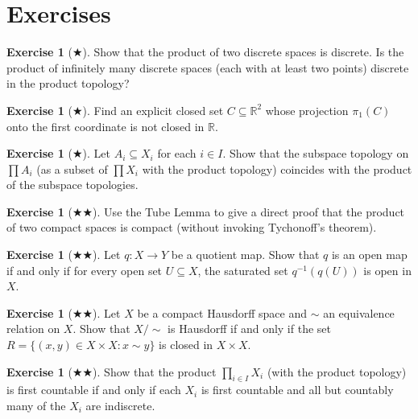 \documentclass[11pt,a4paper,twoside]{book}
\theoremstyle{remark}
\theoremstyle{definition}
\newtheorem{exerciseplain}[theorem]{Exercise}
\theoremstyle{definition}
\newenvironment{exercise}[1][]{%
  \begin{exerciseplain}[#1]
}{%
  \end{exerciseplain}
}
\begin{document}
\section{Exercises}\label{sec:product-quotient-exercises}

\begin{exercise}[$\bigstar$]\label{exo:product-discrete}
Show that the product of two discrete spaces is discrete.
Is the product of infinitely many discrete spaces (each with at
least two points) discrete in the product topology?
\end{exercise}

\begin{exercise}[$\bigstar$]\label{exo:projection-not-closed}
Find an explicit closed set $C\subseteq\mathbb{R}^2$ whose
projection $\pi_1(C)$ onto the first coordinate is not closed
in $\mathbb{R}$.
\end{exercise}

\begin{exercise}[$\bigstar$]\label{exo:product-subspace}
Let $A_i\subseteq X_i$ for each $i\in I$.  Show that the subspace
topology on $\prod A_i$ (as a subset of $\prod X_i$ with the product
topology) coincides with the product of the subspace topologies.
\end{exercise}

\begin{exercise}[$\bigstar\bigstar$]\label{exo:tube-lemma-application}
Use the Tube Lemma to give a direct proof that the product of two
compact spaces is compact (without invoking Tychonoff's theorem).
\end{exercise}

\begin{exercise}[$\bigstar\bigstar$]\label{exo:quotient-open-map}
Let $q\colon X\to Y$ be a quotient map.  Show that $q$ is an open
map if and only if for every open set $U\subseteq X$, the saturated
set $q^{-1}(q(U))$ is open in $X$.
\end{exercise}

\begin{exercise}[$\bigstar\bigstar$]\label{exo:quotient-hausdorff}
Let $X$ be a compact Hausdorff space and $\sim$ an equivalence
relation on $X$.  Show that $X/{\sim}$ is Hausdorff if and only if
the set $R=\{(x,y)\in X\times X:x\sim y\}$ is closed in
$X\times X$.
\end{exercise}

\begin{exercise}[$\bigstar\bigstar$]\label{exo:product-first-countable}
Show that the product $\prod_{i\in I}X_i$ (with the product topology)
is first countable if and only if each $X_i$ is first countable and
all but countably many of the $X_i$ are indiscrete.
\end{exercise}
\end{document}
